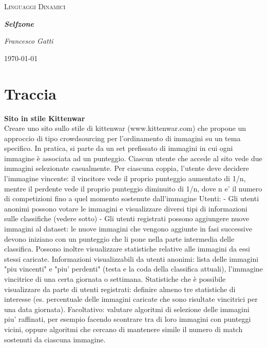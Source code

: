 \documentclass{article}
\newcommand{\proj}{\textit{Selfzone }}
\begin{document}
\begin{titlepage}
	\centering
	{\scshape\LARGE Linguaggi Dinamici\par}
	\vspace{1cm}
	{\huge\bfseries \proj\par}
	\vspace{2cm}
	{\Large\itshape Francesco Gatti\par}
	\vfill

	{\large \today\par}
\end{titlepage}

\renewcommand{\contentsname}{Indice}
\tableofcontents
\clearpage

\section{Traccia}
\textbf{Sito in stile Kittenwar}\\
Creare uno sito sullo stile di kittenwar (www.kittenwar.com) che propone un approccio di tipo
crowdsourcing per l'ordinamento di immagini su un tema specifico.
In pratica, si parte da un set prefissato di immagini in cui ogni immagine è associata ad un
punteggio. Ciascun utente che accede al sito vede due immagini selezionate casualmente. Per
ciascuna coppia, l'utente deve decidere l'immagine vincente: il vincitore vede il proprio punteggio
aumentato di 1/n, mentre il perdente vede il proprio punteggio diminuito di 1/n, dove n e' il numero
di competizioni fino a quel momento sostenute dall'immagine
Utenti:
- Gli utenti anonimi possono votare le immagini e visualizzare diversi tipi di informazioni sulle
classifiche (vedere sotto)
- Gli utenti registrati possono aggiungere nuove immagini al dataset: le nuove immagini che
vengono aggiunte in fasi successive devono iniziano con un punteggio che li pone nella parte
intermedia delle classifica. Possono inoltre visualizzare statistiche relative alle immagini da essi
stessi caricate.
Informazioni visualizzabili da utenti anonimi: lista delle immagini "piu vincenti" e "piu' perdenti"
(testa e la coda della classifica attuali), l'immagine vincitrice di una certa giornata o settimana.
Statistiche che è possibile visualizzare da parte di utenti registrati: definire almeno tre statistiche di
interesse (es. percentuale delle immagini caricate che sono risultate vincitrici per una data giornata).
Facoltativo: valutare algoritmi di selezione delle immagini piu' raffinati, per esempio facendo
scontrare tra di loro immagini con punteggi vicini, oppure algoritmi che cercano di mantenere
simile il numero di match sostenuti da ciascuna immagine.
\clearpage
\end{document}
